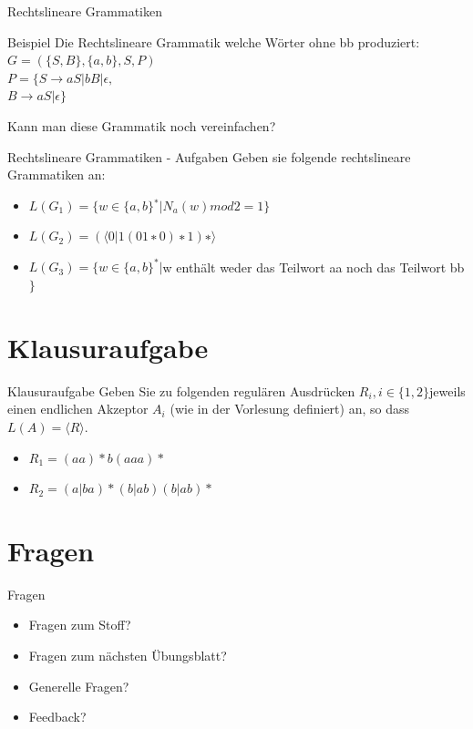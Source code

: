 	
	\begin{frame}{Rechtslineare Grammatiken} 
		\begin{exampleblock}{Beispiel}
			Die Rechtslineare Grammatik welche Wörter ohne bb produziert:\\
			\vspace{10pt}
			$G = (\{S, B\},\{a,b\}, S, P)$\\
			$P = \{ S \rightarrow aS | bB | \epsilon,$\\
			\hspace{27pt}$B \rightarrow aS | \epsilon \}$
		\end{exampleblock}
		
		 {Kann man diese Grammatik noch vereinfachen?}
	\end{frame}
	
	
	\begin{frame}{Rechtslineare Grammatiken - Aufgaben} 
		Geben sie folgende rechtslineare Grammatiken an:
		\begin{itemize}
			\item $L(G_1) = \{w\in \{a,b\}^∗|N_a(w) mod 2 = 1\}$
			\item $L(G_2) = (\langle 0|1(01∗0)∗1)∗\rangle$
			\item $L(G_3) = \{w \in \{a,b\}^*|$w enthält weder das Teilwort aa noch das Teilwort bb$\}$
		\end{itemize}
	\end{frame}
	
	
	\section{Klausuraufgabe}	
	
	\begin{frame}{Klausuraufgabe}
		Geben Sie zu folgenden regulären Ausdrücken $R_i, i\in \{1,2\} $jeweils einen endlichen Akzeptor $A_i$ (wie in der Vorlesung definiert) an, so dass $L(A) = \langle R \rangle$.\\
		\begin{itemize}
			\item $R_1 = (aa)*b(aaa)*$
			\item $R_2 = (a|ba)*(b|ab)(b|ab)*$
		\end{itemize}
	\end{frame}
	
	
	\section{Fragen}
	\begin{frame} {Fragen}
		\begin{itemize}
			\item Fragen zum Stoff?
			\item Fragen zum n\"achsten \"Ubungsblatt?
			\item Generelle Fragen?
			\item Feedback?
		\end{itemize}
	\end{frame}	
		
